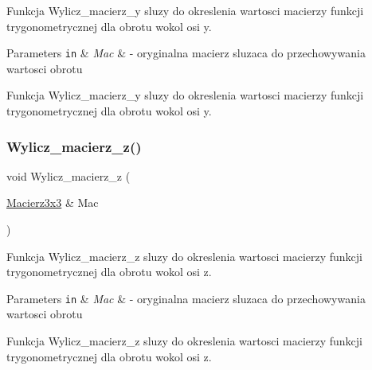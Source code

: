 Funkcja Wylicz\+\_\+macierz\+\_\+y sluzy do okreslenia wartosci macierzy funkcji trygonometrycznej dla obrotu wokol osi y. 


\begin{DoxyParams}[1]{Parameters}
\mbox{\tt in}  & {\em Mac} & -\/ oryginalna macierz sluzaca do przechowywania wartosci obrotu\\
\hline
\end{DoxyParams}
Funkcja Wylicz\+\_\+macierz\+\_\+y sluzy do okreslenia wartosci macierzy funkcji trygonometrycznej dla obrotu wokol osi y. \mbox{\label{Macierz3x3_8hh_ab551a0498128eb4b007c4243e9840a40}} 
\subsubsection{\texorpdfstring{Wylicz\+\_\+macierz\+\_\+z()}{Wylicz\_macierz\_z()}}
{\footnotesize\ttfamily void Wylicz\+\_\+macierz\+\_\+z (\begin{DoxyParamCaption}\item[{\hyperlink{classMacierz}{Macierz3x3} \&}]{Mac }\end{DoxyParamCaption})}



Funkcja Wylicz\+\_\+macierz\+\_\+z sluzy do okreslenia wartosci macierzy funkcji trygonometrycznej dla obrotu wokol osi z. 


\begin{DoxyParams}[1]{Parameters}
\mbox{\tt in}  & {\em Mac} & -\/ oryginalna macierz sluzaca do przechowywania wartosci obrotu\\
\hline
\end{DoxyParams}
Funkcja Wylicz\+\_\+macierz\+\_\+z sluzy do okreslenia wartosci macierzy funkcji trygonometrycznej dla obrotu wokol osi z. 